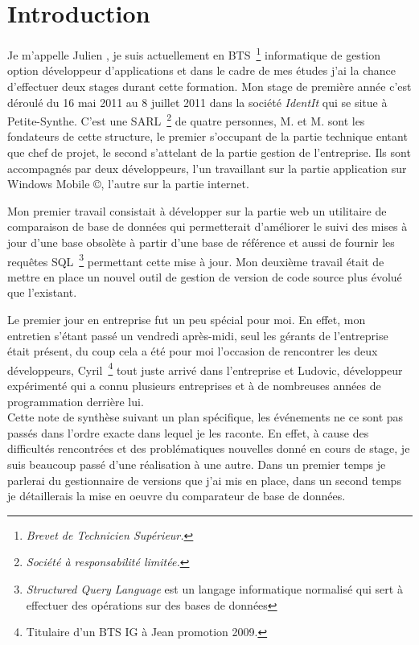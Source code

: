 \chapter{Introduction}

Je m'appelle Julien , je suis actuellement en BTS\,
\footnote{\emph{Brevet de Technicien Supérieur.}} informatique de gestion
option développeur d'applications et dans le cadre de mes études j'ai la chance
d'effectuer deux stages durant cette formation. Mon stage de première année
c'est déroulé du 16 mai 2011 au 8 juillet 2011 dans la société \emph{IdentIt}
qui se situe à Petite-Synthe. C'est une SARL\, \footnote{\emph{Société à
responsabilité limitée.}} de quatre personnes, M. et
M. sont les fondateurs de cette structure, le premier s'occupant de
la partie technique entant que chef de projet, le second s'attelant de la
partie gestion de l'entreprise. Ils sont accompagnés par deux développeurs,
l'un travaillant sur la partie application sur Windows Mobile \copyright,
l'autre sur la partie internet.

Mon premier travail consistait à développer sur la partie web un utilitaire de
comparaison de base de données qui permetterait d'améliorer le suivi des mises
à jour d'une base obsolète à partir d'une base de référence et aussi de fournir
les requêtes SQL\, \footnote{\emph{Structured Query Language} est un langage
informatique normalisé qui sert à effectuer des opérations sur des bases de
données} permettant cette mise à jour. Mon deuxième travail était de mettre en
place un nouvel outil de gestion de version de code source plus évolué que
l'existant.

Le premier jour en entreprise fut un peu spécial pour moi. En effet, mon
entretien s'étant passé un vendredi après-midi, seul les gérants de
l'entreprise était présent, du coup cela a été pour moi l'occasion de
rencontrer les deux développeurs, Cyril\, \footnote{Titulaire d'un BTS IG à
Jean  promotion 2009.} tout juste arrivé dans l'entreprise et
Ludovic, développeur expérimenté qui a connu plusieurs entreprises et à de
nombreuses années de programmation derrière lui.\\ Cette note de synthèse
suivant un plan spécifique, les événements ne ce sont pas passés dans l'ordre
exacte dans lequel je les raconte. En effet, à cause des difficultés
rencontrées et des problématiques nouvelles donné en cours de stage, je suis
beaucoup passé d'une réalisation à une autre. Dans un premier temps je parlerai
du gestionnaire de versions que j'ai mis en place, dans un second temps je
détaillerais la mise en oeuvre du comparateur de base de données.

\clearpage
